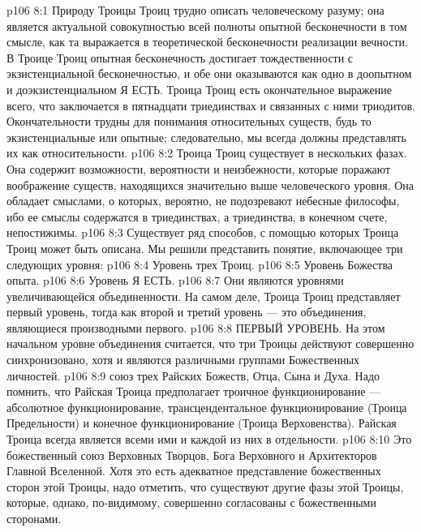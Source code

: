 \vs p106 8:1 Природу Троицы Троиц трудно описать человеческому разуму; она является актуальной совокупностью всей полноты опытной бесконечности в том смысле, как та выражается в теоретической бесконечности реализации вечности. В Троице Троиц опытная бесконечность достигает тождественности с экзистенциальной бесконечностью, и обе они оказываются как одно в доопытном и доэкзистенциальном Я ЕСТЬ. Троица Троиц есть окончательное выражение всего, что заключается в пятнадцати триединствах и связанных с ними триодитов. Окончательности трудны для понимания относительных существ, будь то экзистенциальные или опытные; следовательно, мы всегда должны представлять их как относительности.
\vs p106 8:2 Троица Троиц существует в нескольких фазах. Она содержит возможности, вероятности и неизбежности, которые поражают воображение существ, находящихся значительно выше человеческого уровня. Она обладает смыслами, о которых, вероятно, не подозревают небесные философы, ибо ее смыслы содержатся в триединствах, а триединства, в конечном счете, непостижимы.
\vs p106 8:3 Существует ряд способов, с помощью которых Троица Троиц может быть описана. Мы решили представить понятие, включающее три следующих уровня:
\vs p106 8:4 \bibnobreakspace Уровень трех Троиц.
\vs p106 8:5 \bibnobreakspace Уровень Божества опыта.
\vs p106 8:6 \bibnobreakspace Уровень Я ЕСТЬ.
\vs p106 8:7 \pc Они являются уровнями увеличивающейся объединенности. На самом деле, Троица Троиц представляет первый уровень, тогда как второй и третий уровень --- это объединения, являющиеся производными первого.
\vs p106 8:8 \pc ПЕРВЫЙ УРОВЕНЬ. На этом начальном уровне объединения считается, что три Троицы действуют совершенно синхронизовано, хотя и являются различными группами Божественных личностей.
\vs p106 8:9 \bibnobreakspace {} союз трех Райских Божеств, Отца, Сына и Духа. Надо помнить, что Райская Троица предполагает троичное функционирование --- абсолютное функционирование, трансцендентальное функционирование (Троица Предельности) и конечное функционирование (Троица Верховенства). Райская Троица всегда является всеми ими и каждой из них в отдельности.
\vs p106 8:10 \pc {}\bibnobreakspace {} Это божественный союз Верховных Творцов, Бога Верховного и Архитекторов Главной Вселенной. Хотя это есть адекватное представление божественных сторон этой Троицы, надо отметить, что существуют другие фазы этой Троицы, которые, однако, по\hyp{}видимому, совершенно согласованы с божественными сторонами.
